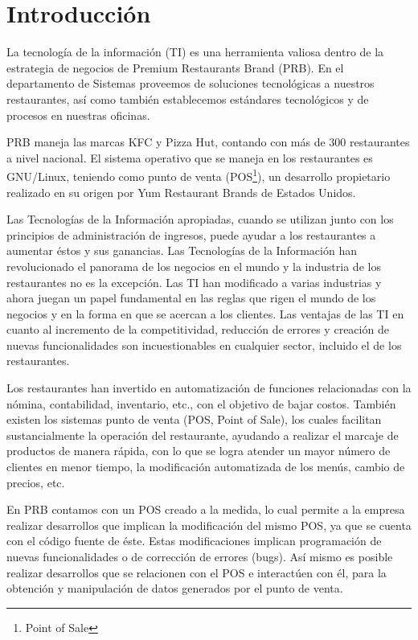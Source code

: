
\chapter{Introducción}

\label{chap:intro}

La tecnología de la información (TI) es una herramienta valiosa dentro de la estrategia de negocios de Premium Restaurants Brand (PRB). En el departamento de Sistemas proveemos de soluciones tecnológicas a nuestros restaurantes, así como también establecemos estándares tecnológicos y de procesos en nuestras oficinas.

PRB maneja las marcas KFC y Pizza Hut, contando con más de 300 restaurantes a nivel nacional. El sistema operativo que se maneja en los restaurantes es GNU/Linux, teniendo como punto de venta (POS\footnote{Point of Sale}), un desarrollo propietario realizado en su origen por Yum Restaurant Brands de Estados Unidos.

Las Tecnologías de la Información apropiadas, cuando se utilizan junto con los principios de administración de ingresos, puede ayudar a los restaurantes a aumentar éstos y sus ganancias. Las Tecnologías de la Información han revolucionado el panorama de los negocios en el mundo y la industria de los restaurantes no es la excepción. Las TI han modificado a varias industrias y ahora juegan un papel fundamental en las reglas que rigen el mundo de los negocios y en la forma en que se acercan a los clientes. Las ventajas de las TI en cuanto al incremento de la competitividad, reducción de errores y creación de nuevas funcionalidades son incuestionables en cualquier sector, incluido el de los restaurantes.

Los restaurantes han invertido en automatización de funciones relacionadas con la nómina, contabilidad, inventario, etc., con el objetivo de bajar costos. También existen los sistemas punto de venta (POS, Point of Sale), los cuales facilitan sustancialmente la operación del restaurante, ayudando a realizar el marcaje de productos de manera rápida, con lo que se logra atender un mayor número de clientes en menor tiempo, la modificación automatizada de los menús, cambio de precios, etc.

En PRB contamos con un POS creado a la medida, lo cual permite a la empresa realizar desarrollos que implican la modificación del mismo POS, ya que se cuenta con el código fuente de éste. Estas modificaciones implican programación de nuevas funcionalidades o de corrección de errores (bugs). Así mismo es posible realizar desarrollos que se relacionen con el POS e interactúen con él, para la obtención y manipulación de datos generados por el punto de venta.

